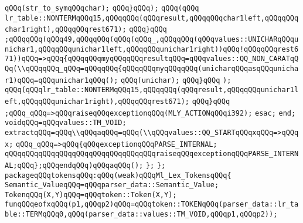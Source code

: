 \verb|qQQq(str_to_symqQQqchar);|\newline
\verb|qQQq}qQQq);|\newline
\verb|qQQq(qQQq|\newline
\verb|lr_table::NONTERMqQQq15,qQQqqQQq(qQQqresult,qQQqqQQqchar1left,qQQqqQQqchar1right),qQQqqQQqrest671);|\newline
\verb|qQQq}qQQq|\newline
\verb|;qQQqqQQq(qQQq49,qQQqqQQq(qQQq(qQQq_,qQQqqQQq(qQQqvalues::UNICHARqQQqunichar1,qQQqqQQqunichar1left,qQQqqQQqunichar1right))qQQq!qQQqqQQqrest671))qQQq=>qQQq{qQQqqQQqmyqQQqqQQqresultqQQq=qQQqvalues::QQ_NON_CARATqQQq(\\qQQqqQQq_qQQq=qQQqqQQq{qQQqqQQqmyqQQqqQQq(unicharqQQqasqQQqunichar1)qQQq=qQQqunichar1qQQq();|\newline
\verb|qQQq(unichar);|\newline
\verb|qQQq}qQQq|\newline
\verb|);|\newline
\verb|qQQq(qQQqlr_table::NONTERMqQQq15,qQQqqQQq(qQQqresult,qQQqqQQqunichar1left,qQQqqQQqunichar1right),qQQqqQQqrest671);|\newline
\verb|qQQq}qQQq|\newline
\verb|;qQQq_qQQq=>qQQqraiseqQQqexceptionqQQq(MLY_ACTIONqQQqi392);|\newline
\verb|esac;|\newline
\verb|end;|\newline
\verb|voidqQQq=qQQqvalues::TM_VOID;|\newline
\verb|extractqQQq=qQQq\\qQQqaqQQq=qQQq(\\qQQqvalues::QQ_STARTqQQqxqQQq=>qQQqx;|\newline
\verb|qQQq_qQQq=>qQQq{qQQqexceptionqQQqPARSE_INTERNAL;|\newline
\verb|qQQqqQQqqQQqqQQqqQQqqQQqqQQqqQQqqQQqraiseqQQqexceptionqQQqPARSE_INTERNAL;qQQq};qQQqendqQQq)qQQqaqQQq();|\newline
\verb|};|\newline
\verb|};|\newline
\verb|packageqQQqtokensqQQq:qQQq(weak)qQQqMl_Lex_TokensqQQq{|\newline
\verb|Semantic_ValueqQQq=qQQqparser_data::Semantic_Value;|\newline
\verb|TokenqQQq(X,Y)qQQq=qQQqtoken::Token(X,Y);|\newline
\verb|funqQQqeofxqQQq(p1,qQQqp2)qQQq=qQQqtoken::TOKENqQQq(parser_data::lr_table::TERMqQQq0,qQQq(parser_data::values::TM_VOID,qQQqp1,qQQqp2));|\newline
